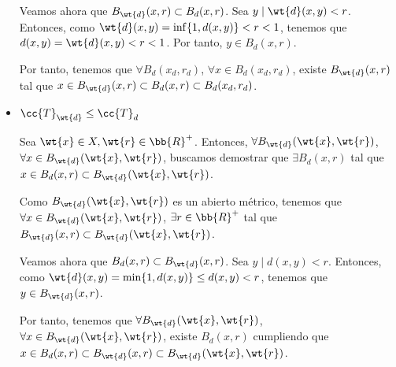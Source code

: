 \begin{ejercicio}
\begin{itemize}
        Veamos ahora que $B_{\wt{d}}(x,r)\subset B_d(x,r)$. Sea $y\mid \wt{d}(x,y)<r$. Entonces, como $\wt{d}(x,y)=\inf\{1,d(x,y)\}<r<1$, tenemos que $d(x,y)=\wt{d}(x,y)<r<1$. Por tanto, $y\in B_d(x,r)$.

        Por tanto, tenemos que $\forall B_d(x_d,r_d)$, $\forall x\in B_d(x_d,r_d)$, existe $B_{\wt{d}}(x,r)$ tal que $x\in B_{\wt{d}}(x,r)\subset B_d(x,r) \subset  B_d(x_d,r_d)$.

        \item \ul{$\cc{T}_{\wt{d}}\leq \cc{T}_d$}

        Sea $\wt{x}\in X, \wt{r}\in \bb{R}^+$. Entonces, $\forall B_{\wt{d}}(\wt{x},\wt{r})$, $\forall x\in B_{\wt{d}}(\wt{x},\wt{r})$, buscamos demostrar que $\exists B_d(x,r)$ tal que $x\in B_d(x,r)\subset B_{\wt{d}}(\wt{x},\wt{r})$.

        Como $B_{\wt{d}}(\wt{x},\wt{r})$ es un abierto métrico, tenemos que $\forall x\in B_{\wt{d}}(\wt{x},\wt{r})$, $\exists r\in \bb{R}^+$ tal que $B_{\wt{d}}(x, r)\subset B_{\wt{d}}(\wt{x},\wt{r})$.

        Veamos ahora que $B_d(x,r)\subset B_{\wt{d}}(x,r)$. Sea $y\mid d(x,y)<r$. Entonces, como $\wt{d}(x,y)=\min\{1,d(x,y)\}\leq d(x,y)<r$, tenemos que $y\in B_{\wt{d}}(x,r)$.
        
        Por tanto, tenemos que $\forall B_{\wt{d}}(\wt{x},\wt{r})$, $\forall x\in B_{\wt{d}}(\wt{x},\wt{r})$, existe $B_d(x,r)$ cumpliendo que $x\in B_d(x,r)\subset B_{\wt{d}}(x,r)\subset B_{\wt{d}}(\wt{x},\wt{r})$.
        
    \end{itemize}
\end{ejercicio}

